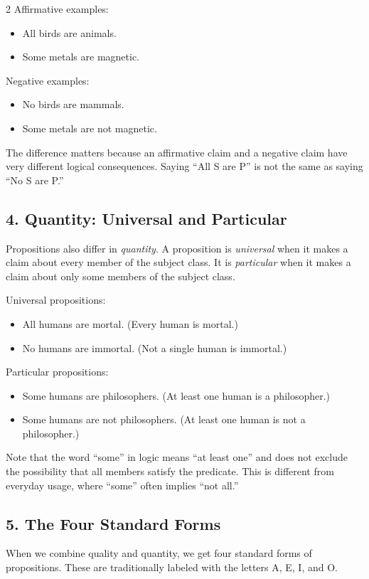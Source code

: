 \documentclass[12pt]{article}
\begin{document}
\begin{multicols}{2}
Affirmative examples:
\begin{itemize}
\item All birds are animals.
\item Some metals are magnetic.
\end{itemize}

Negative examples:
\begin{itemize}
\item No birds are mammals.
\item Some metals are not magnetic.
\end{itemize}

The difference matters because an affirmative claim and a negative claim have very different logical consequences. Saying “All S are P” is not the same as saying “No S are P.”

\subsection*{4. Quantity: Universal and Particular}
Propositions also differ in \textit{quantity}. A proposition is \textit{universal} when it makes a claim about every member of the subject class. It is \textit{particular} when it makes a claim about only some members of the subject class.

Universal propositions:
\begin{itemize}
\item All humans are mortal. (Every human is mortal.)
\item No humans are immortal. (Not a single human is immortal.)
\end{itemize}

Particular propositions:
\begin{itemize}
\item Some humans are philosophers. (At least one human is a philosopher.)
\item Some humans are not philosophers. (At least one human is not a philosopher.)
\end{itemize}

Note that the word “some” in logic means “at least one” and does not exclude the possibility that all members satisfy the predicate. This is different from everyday usage, where “some” often implies “not all.”

\subsection*{5. The Four Standard Forms}
When we combine quality and quantity, we get four standard forms of propositions. These are traditionally labeled with the letters A, E, I, and O.


\end{multicols}
\end{document}
